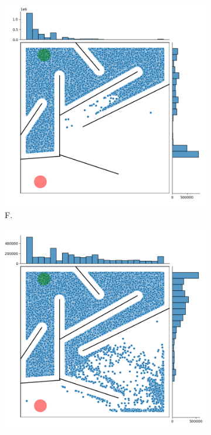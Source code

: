 \begin{figure}[H]
    \begin{mdframed}
        \begin{subfigure}[t]{0.45\textwidth}
            \includegraphics[scale=0.3]{resources/mazes/pure_fitness_hard.png}
            \caption{F.}
        \end{subfigure}
        \begin{subfigure}[t]{0.5\textwidth}
            \includegraphics[scale=0.3]{resources/mazes/pure_novelty_hard.png}

\end{subfigure}
\end{mdframed}
\end{figure}
